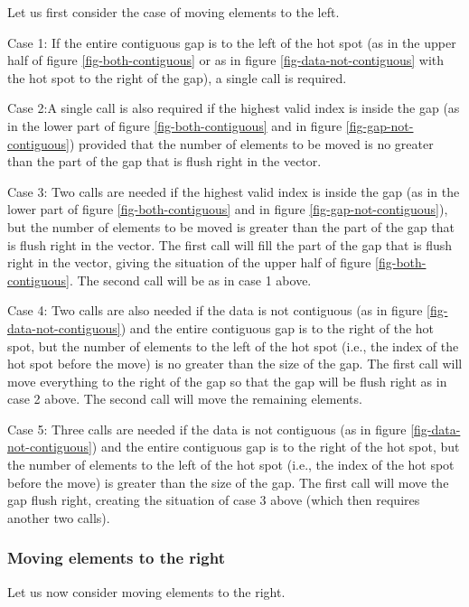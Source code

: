 \documentclass[11pt]{article}
\begin{document}
Let us first consider the case of moving elements to the left.

Case 1: If the entire contiguous gap is to the left of the hot spot
(as in the upper half of figure \ref{fig-both-contiguous} or as in
figure \ref{fig-data-not-contiguous} with the hot spot to the right of
the gap), a single call is required.

Case 2:A single call is also required if the highest valid index is
inside the gap (as in the lower part of figure
\ref{fig-both-contiguous} and in figure \ref{fig-gap-not-contiguous})
provided that the number of elements to be moved is no greater than
the part of the gap that is flush right in the vector.

Case 3: Two calls are needed if the highest valid index is inside the
gap (as in the lower part of figure \ref{fig-both-contiguous} and in
figure \ref{fig-gap-not-contiguous}), but the number of elements to be
moved is greater than the part of the gap that is flush right in the
vector.  The first call will fill the part of the gap that is flush
right in the vector, giving the situation of the upper half of figure
\ref{fig-both-contiguous}.  The second call will be as in case 1
above.

Case 4: Two calls are also needed if the data is not contiguous (as in
figure \ref{fig-data-not-contiguous}) and the entire contiguous gap is
to the right of the hot spot, but the number of elements to the left
of the hot spot (i.e., the index of the hot spot before the move) is
no greater than the size of the gap.  The first call will move
everything to the right of the gap so that the gap will be flush right
as in case 2 above.  The second call will move the remaining
elements.

Case 5: Three calls are needed  if the data is not contiguous (as in
figure \ref{fig-data-not-contiguous}) and the entire contiguous gap is
to the right of the hot spot, but the number of elements to the left
of the hot spot (i.e., the index of the hot spot before the move) is
greater than the size of the gap.  The first call will move the gap
flush right, creating the situation of case 3 above (which then
requires another two calls).

\subsubsection{Moving elements to the right}

Let us now consider moving elements to the right.
\end{document}

